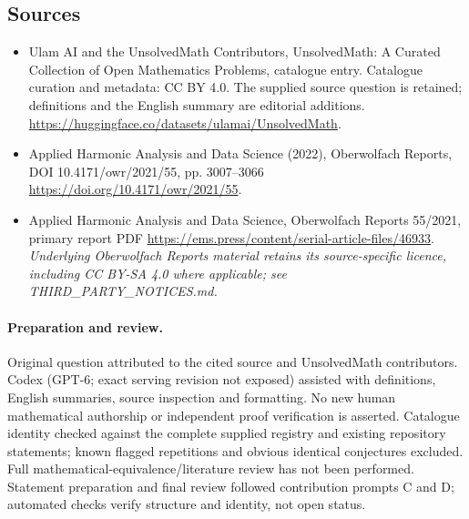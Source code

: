 \documentclass[11pt]{article}
\begin{document}
\subsection{Sources}
\begin{itemize}
\item[\hypertarget{source:statement:1}{S1}] Ulam AI and the UnsolvedMath Contributors, UnsolvedMath: A Curated Collection of Open Mathematics Problems, catalogue entry. Catalogue curation and metadata: CC BY 4.0. The supplied source question is retained; definitions and the English summary are editorial additions.
\url{https://huggingface.co/datasets/ulamai/UnsolvedMath}.
\item[\hypertarget{source:statement:2}{S2}] Applied Harmonic Analysis and Data Science (2022), Oberwolfach Reports, DOI 10.4171/owr/2021/55, pp. 3007--3066
\url{https://doi.org/10.4171/owr/2021/55}.
\item[\hypertarget{source:statement:3}{S3}] Applied Harmonic Analysis and Data Science, Oberwolfach Reports 55/2021, primary report PDF
\url{https://ems.press/content/serial-article-files/46933}.
\textit{Underlying Oberwolfach Reports material retains its source-specific licence, including CC BY-SA 4.0 where applicable; see THIRD\_PARTY\_NOTICES.md.}
\end{itemize}
\paragraph{Preparation and review.}
Original question attributed to the cited source and UnsolvedMath contributors. Codex (GPT-6; exact serving revision not exposed) assisted with definitions, English summaries, source inspection and formatting. No new human mathematical authorship or independent proof verification is asserted. Catalogue identity checked against the complete supplied registry and existing repository statements; known flagged repetitions and obvious identical conjectures excluded. Full mathematical-equivalence/literature review has not been performed. Statement preparation and final review followed contribution prompts C and D; automated checks verify structure and identity, not open status.
\label{end:statement}
\end{document}
